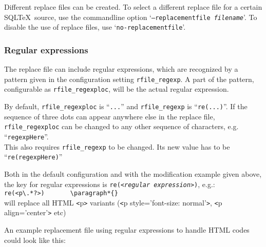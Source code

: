 \documentclass{article}
\newcommand{\vs}{\vspace{3mm}}
\begin{document}
Different replace files can be created. To select a different replace file for a certain SQL\TeX\ source, use the commandline option
`\texttt{--replacementfile \textit{filename}}'. To disable the use of replace files, use `\texttt{no-replacementfile}'.

\subsubsection{Regular expressions}\label{regexp}

The replace file can include regular expressions, which are recognized by a pattern given in the configuration setting \texttt{rfile\_regexp}. A part of the pattern, configurable as \texttt{rfile\_regexploc}, will be the actual regular expression.

\vs

By default, \texttt{rfile\_regexploc} is ``\texttt{...}'' and \texttt{rfile\_regexp} is ``\texttt{re(...)}''. If the sequence of three dots can appear anywhere else in the replace file, \texttt{rfile\_regexploc} can be changed to any other sequence of characters, e.g. ``\texttt{regexpHere}''.\\
This also requires \texttt{rfile\_regexp} to be changed. Its new value has to be ``\texttt{re(regexpHere)}''
 
\vs

Both in the default configuration and with the modification example given above, the key for regular expressions is \texttt{re(<\textit{regular expression}>)}, e.g.:\\
\hspace{3mm}\verb+re(<p\.*?>)		\paragraph*{}+ \\
will replace all HTML \texttt{<}p\texttt{>} variants (\texttt{<}p style='font-size: normal'\texttt{>}, \texttt{<}p align='center'\texttt{>} etc)

\vs

An example replacement file using regular expressions to handle HTML codes could look like this:
\end{document}
